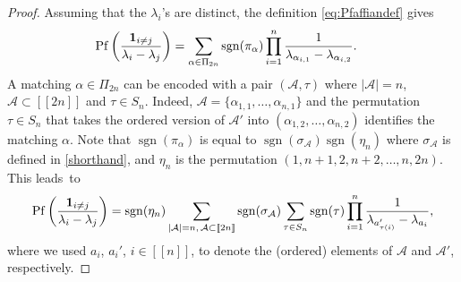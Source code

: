 \documentclass[10pt,a4paper]{amsart}
\newcommand{\Pf}{\operatorname{Pf}}
\newcommand{\cA}{\mathcal{A}}
\newcommand{\ind}{{\bf{1}}}
\newcommand{\lst}[1]{[\![#1 ]\!]}
\newcommand{\sgn}{\operatorname{sgn}}
\begin{document}
\begin{proof} Assuming that the $\lambda_i$'s are distinct, the definition \eqref{eq:Pfaffiandef} gives
\begin{align*}
 \Pf\left(\frac{\ind_{i\neq j}}{\lambda_i-\lambda_j}\right)&
 =\sum_{\alpha\in \Pi_{2n}} \sgn(\pi_\alpha) \prod_{i=1}^n \frac{1}{\lambda_{\alpha_{i,1}}-\lambda_{\alpha_{i,2}}}.
\end{align*}
A matching $\alpha \in \Pi_{2n}$ can be encoded with a pair $(\cA, \tau)$ where $|\cA|=n$, $\cA\subset \lst{2n}$ and $\tau\in S_n$. Indeed, $\cA=\{\alpha_{1,1}, \dots, \alpha_{n,1}\}$ and the permutation $\tau\in S_n$ that takes the ordered version of $\cA'$ into $(\alpha_{1,2}, \dots, \alpha_{n,2})$ identifies the matching $\alpha$. Note that $\sgn(\pi_\alpha)$ is equal to $\sgn(\sigma_{\cA} )\sgn(\eta_n)$ where $\sigma_{\cA}$ is defined in \eqref{shorthand}, and $\eta_n$ is the permutation $(1,n+1,2, n+2, \dots, n, 2n)$. This leads~to
\begin{align}
 \label{eq:Pf4_2}
\Pf\left(\frac{\ind_{i\neq j}}{\lambda_i-\lambda_j}\right)=\sgn(\eta_n) \sum_{|\cA|=n,\, \cA\subset \lst{2n}} \sgn(\sigma_{\cA}) \sum_{\tau\in S_n} \sgn(\tau) \prod_{i=1}^n \frac{1}{\lambda_{a'_{\tau(i)}}-\lambda_{a_i}},
\end{align}
where we used $a_i$, $a_i'$, $i\in \lst{n}$, to denote the (ordered) elements of $\cA$ and $ \cA'$, respectively.


\end{proof}
\end{document}

